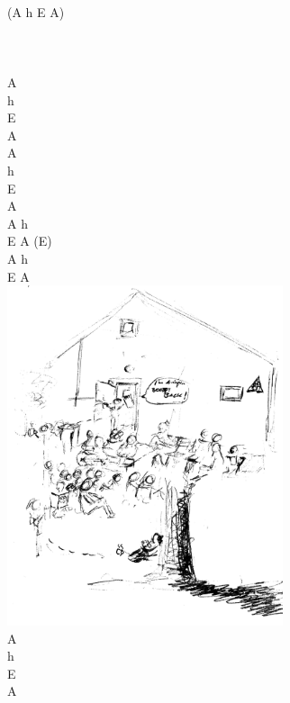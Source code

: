 \documentclass[a5paper, 10pt]{book}
\begin{document}
\begin{minipage}[t]{0.2\textwidth}
  ~\\
  (A h E A)\\~\\~\\~\\
  A\\
  h\\
  E\\
  A\\

  A\\
  h\\
  E\\
  A\\

  A h\\
  E A (E)\\
  A h\\
  E A\\

  \includegraphics[height=10cm, right]{images/all_about_that_bass_2.png}\vspace*{-10cm}\\
  A\\
  h\\
  E\\
  A\\
\end{minipage}

\newpage
\end{document}
